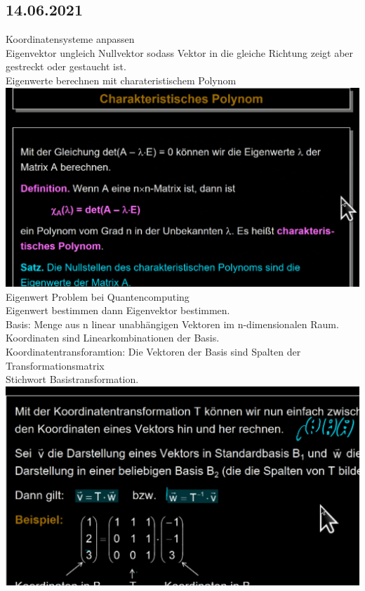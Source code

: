 \documentclass{article}
\begin{document}
	\subsection*{14.06.2021}
	Koordinatensysteme anpassen \\
	Eigenvektor ungleich Nullvektor sodass Vektor in die gleiche Richtung zeigt aber gestreckt oder gestaucht ist. \\
	Eigenwerte berechnen mit charateristischem Polynom \\
	\includegraphics[width=\linewidth]{charpolynom} \\
	Eigenwert Problem bei Quantencomputing \\
	Eigenwert bestimmen dann Eigenvektor bestimmen. \\
	Basis: Menge aus n linear unabhängigen Vektoren im n-dimensionalen Raum. \\
	Koordinaten sind Linearkombinationen der Basis. \\
	Koordinatentransforamtion: Die Vektoren der Basis sind Spalten der Transformationsmatrix \\
	Stichwort Basistransformation. \\
	\includegraphics[width=\linewidth]{transformer} 
\end{document}
